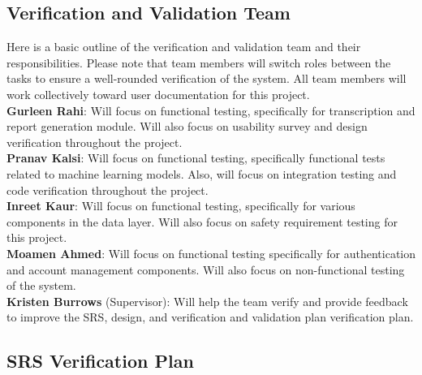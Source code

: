 \documentclass[12pt, titlepage]{article}
\begin{document}
\subsection{Verification and Validation Team} \label{section:3.1}

Here is a basic outline of the verification and validation team and their responsibilities. Please note that team members will switch roles between the tasks to ensure a well-rounded verification of the system. All team members will work collectively toward user documentation for this project.\\
\textbf{Gurleen Rahi}: Will focus on functional testing, specifically for transcription and report generation module. Will also focus on usability survey and design verification throughout the project.\\
\textbf{Pranav Kalsi}: Will focus on functional testing, specifically functional tests related to machine learning models. Also, will focus on integration testing and code verification throughout the project.\\
\textbf{Inreet Kaur}: Will focus on functional testing, specifically for various components in the data layer. Will also focus on safety requirement testing for this project.\\
\textbf{Moamen Ahmed}: Will focus on functional testing specifically for authentication and account management components. Will also focus on non-functional testing of the system.\\
\textbf{Kristen Burrows} (Supervisor): Will help the team verify and provide feedback to improve the SRS, design, and verification and validation plan verification plan.\\


\subsection{SRS Verification Plan} \label{section:3.2}
\end{document}
